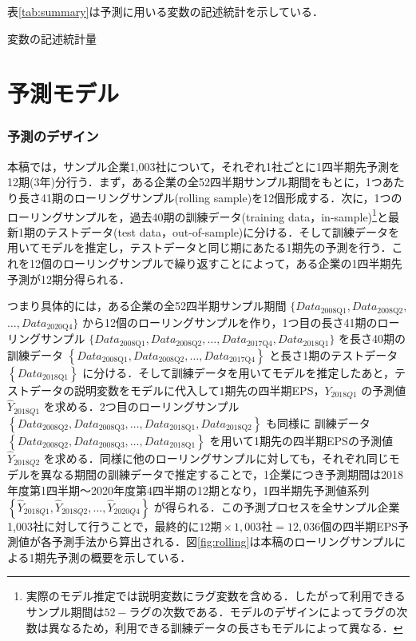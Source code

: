 \documentclass[a4paper，11pt]{jsarticle}
\begin{document}
表\ref{tab:summary}は予測に用いる変数の記述統計を示している．

\begin{table}[tbp]
  \centering
  \caption{変数の記述統計量}
  \label{tab:summary}
  \small
  
\end{table}
    
\part{予測モデル} \label{par:model}

\section{予測のデザイン}

本稿では，サンプル企業1,003社について，それぞれ1社ごとに1四半期先予測を12期(3年)分行う．まず，ある企業の全52四半期サンプル期間をもとに，1つあたり長さ41期のローリングサンプル(rolling sample)を12個形成する．次に，1つのローリングサンプルを，過去40期の訓練データ(training data，in-sample)\footnote{実際のモデル推定では説明変数にラグ変数を含める．したがって利用できるサンプル期間は$52 - ラグの次数$である．モデルのデザインによってラグの次数は異なるため，利用できる訓練データの長さもモデルによって異なる．}と最新1期のテストデータ(test data，out-of-sample)に分ける．そして訓練データを用いてモデルを推定し，テストデータと同じ期にあたる1期先の予測を行う．これを12個のローリングサンプルで繰り返すことによって，ある企業の1四半期先予測が12期分得られる．

つまり具体的には，ある企業の全52四半期サンプル期間 $\{Data_{\text{2008Q1}}, Data_{\text{2008Q2}},$ $\ldots, Data_{\text{2020Q4}}\}$ から12個のローリングサンプルを作り，1つ目の長さ41期のローリングサンプル $\{Data_{\text{2008Q1}}, Data_{\text{2008Q2}},\ldots, Data_{\text{2017Q4}}, Data_{\text{2018Q1}}\}$ を長さ40期の訓練データ $\left\{Data_{\text{2008Q1}}, Data_{\text{2008Q2}}, \ldots, Data_{\text{2017Q4}}\right\}$ と長さ1期のテストデータ $\left\{Data_{\text{2018Q1}}\right\}$ に分ける．そして訓練データを用いてモデルを推定したあと，テストデータの説明変数をモデルに代入して1期先の四半期EPS，$Y_{2018Q1}$ の予測値 $\hat{Y}_{2018Q1}$ を求める．2つ目のローリングサンプル $\left\{Data_{\text{2008Q2}}, Data_{\text{2008Q3}}, \ldots, Data_{\text{2018Q1}}, Data_{\text{2018Q2}}\right\}$ も同様に 訓練データ $\left\{Data_{\text{2008Q2}}, Data_{\text{2008Q3}}, \ldots, Data_{\text{2018Q1}}\right\}$ を用いて1期先の四半期EPSの予測値 $\hat{Y}_{2018Q2}$ を求める．同様に他のローリングサンプルに対しても，それぞれ同じモデルを異なる期間の訓練データで推定することで，1企業につき予測期間は2018年度第1四半期～2020年度第4四半期の12期となり，1四半期先予測値系列 $\left\{\hat{Y}_{2018Q1}, \hat{Y}_{2018Q2}, \ldots, \hat{Y}_{2020Q4}\right\}$ が得られる．この予測プロセスを全サンプル企業1,003社に対して行うことで，最終的に$12期 \times 1,003社 = 12,036個$の四半期EPS予測値が各予測手法から算出される．図\ref{fig:rolling}は本稿のローリングサンプルによる1期先予測の概要を示している．
\end{document}
